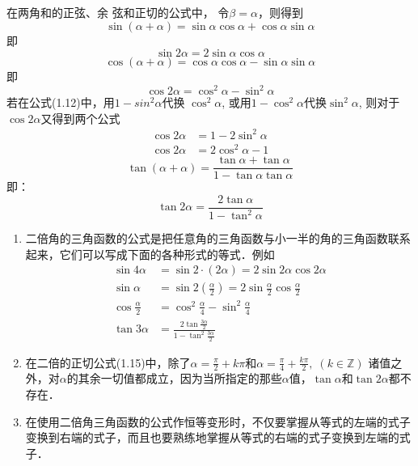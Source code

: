 在两角和的正弦、余
弦和正切的公式中，
令$\beta=\alpha$，则得到
\[\sin(\alpha+\alpha)=\sin\alpha\cos\alpha+\cos\alpha\sin\alpha\]
即
\begin{equation}
    \sin2\alpha=2\sin\alpha\cos\alpha
\end{equation}
\[\cos(\alpha+\alpha)=\cos\alpha\cos\alpha-\sin\alpha\sin\alpha\]
即
\begin{equation}
    \cos2\alpha=\cos^2\alpha-\sin^2\alpha
\end{equation}
若在公式(1.12)中，用$1-sin^2\alpha$代换 $\cos^2\alpha$, 或用$1-\cos^2\alpha$代换$\sin^2\alpha$, 则对于$\cos2\alpha$又得到两个公式
\begin{align}
    \cos2\alpha&=1-2\sin^2\alpha\\
    \cos2\alpha&=2\cos^2\alpha-1 
\end{align}
\[\tan (\alpha+\alpha)=\frac{\tan\alpha+\tan\alpha}{1-\tan\alpha\tan\alpha}\]
即：
\begin{equation}
    \tan2\alpha=\frac{2\tan\alpha}{1-\tan^2\alpha}
\end{equation}

\begin{rmk}
\begin{enumerate}
    \item 二倍角的三角函数的公式是把任意角的三角函数与小一半的角的三角函数联系起来，它们可以写成下面的各种形式的等式．例如
\[\begin{split}
    \sin4\alpha&=\sin2\cdot (2\alpha) =2\sin2\alpha\cos2\alpha\\
    \sin\alpha&=\sin2\left(\frac{\alpha}{2}\right)=2\sin\frac{\alpha}{2}\cos \frac{\alpha}{2}\\
    \cos\frac{\alpha}{2}&=\cos^2\frac{\alpha}{4}-\sin^2\frac{\alpha}{4}\\
    \tan3\alpha&=\frac{2\tan\frac{3\alpha}{2}}{1-\tan^2\frac{3\alpha}{2}}
\end{split}\]

\item 在二倍的正切公式(1.15)中，除了$\alpha=\frac{\pi}{2}+k\pi$和$\alpha=\frac{\pi}{4}+\frac{k\pi}{2},\; (k\in\mathbb{Z})$
诸值之外，对$\alpha$的其余一切值都成立，因为当所指定的那些$\alpha$值，$\tan\alpha$和$\tan2\alpha$都不存在．
\item 在使用二倍角三角函数的公式作恒等变形时，不仅要掌握从等式的左端的式子变换到右端的式子，而且也要熟练地掌握从等式的右端的式子变换到左端的式子．
\end{enumerate}
\end{rmk}

